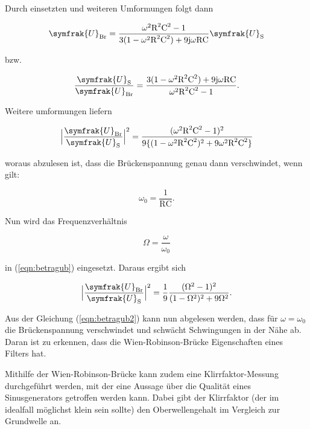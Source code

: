 \noindent
Durch einsetzten und weiteren Umformungen folgt dann

\begin{equation}
\symfrak{U}_\text{Br} = \frac{\omega^2 \text{R}^2 \text{C}^2 - 1}{3 (1 - \omega^2 \text{R}^2 \text{C}^2) + 9 \text{j} \omega \text{R} \text{C}} \symfrak{U}_\text{S}
\end{equation}

\noindent
bzw.

\begin{equation}
\frac{\symfrak{U}_\text{S}}{\symfrak{U}_\text{Br}} = \frac{3 (1 - \omega^2 \text{R}^2 \text{C}^2) + 9 \text{j} \omega \text{R} \text{C}}{\omega^2 \text{R}^2 \text{C}^2 - 1}.
\end{equation}

\noindent 
Weitere umformungen liefern

\begin{equation}
\Bigl| \frac{\symfrak{U}_\text{Br}}{\symfrak{U}_\text{S}} \Bigr|^2 = \frac{(\omega^2 \text{R}^2 \text{C}^2 - 1)^2}{9 \{(1 - \omega^2 \text{R}^2 \text{C}^2)^2 + 9  \omega^2 \text{R}^2 \text{C}^2\}}
\label{eqn:betragub}
\end{equation}

\noindent
woraus abzulesen ist, dass die Brückenspannung genau dann verschwindet, wenn gilt:

\begin{equation}
\omega_0 = \frac{1}{\text{R} \text{C}} .
\end{equation}

\noindent 
Nun wird das Frequenzverhältnis

\begin{equation}
\Omega = \frac{\omega}{\omega_0} 
\end{equation}

\noindent
in (\ref{eqn:betragub}) eingesetzt.
Daraus ergibt sich

\begin{equation}
\Bigl| \frac{\symfrak{U}_\text{Br}}{\symfrak{U}_\text{S}} \Bigr|^2 = \frac{1}{9} \frac{(\Omega^2 - 1)^2}{(1 - \Omega^2)^2 + 9 \Omega^2} .
\label{eqn:betragub2}
\end{equation}

\noindent
Aus der Gleichung (\ref{eqn:betragub2}) kann nun abgelesen werden, dass für $\omega=\omega_0$ die Brückenspannung verschwindet
und schwächt Schwingungen in der Nähe ab.
Daran ist zu erkennen, dass die Wien-Robinson-Brücke Eigenschaften eines Filters hat.

\noindent
Mithilfe der Wien-Robinson-Brücke kann zudem eine Klirrfaktor-Messung durchgeführt werden, mit der eine Aussage über die Qualität eines Sinusgenerators getroffen werden kann.
Dabei gibt der Klirrfaktor (der im idealfall möglichst klein sein sollte) den Oberwellengehalt im Vergleich zur Grundwelle an.

